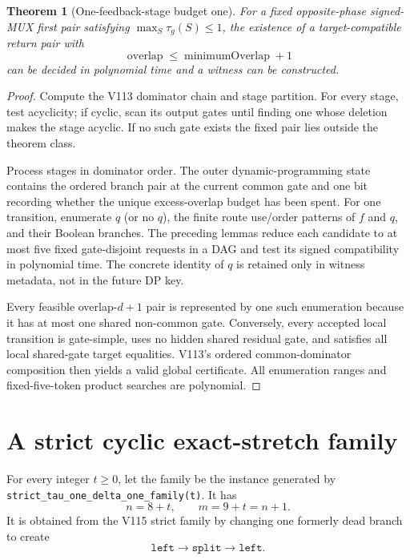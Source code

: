 \documentclass[11pt]{article}
\newtheorem{theorem}{Theorem}
\begin{document}
\begin{theorem}[One-feedback-stage budget one]
For a fixed opposite-phase signed-MUX first pair satisfying $\max_S\tau_g(S)\leq1$, the existence of a target-compatible return pair with
\[
\operatorname{overlap}\leq \operatorname{minimumOverlap}+1
\]
can be decided in polynomial time and a witness can be constructed.
\end{theorem}
\begin{proof}
Compute the V113 dominator chain and stage partition. For every stage, test acyclicity; if cyclic, scan its output gates until finding one whose deletion makes the stage acyclic. If no such gate exists the fixed pair lies outside the theorem class.

Process stages in dominator order. The outer dynamic-programming state contains the ordered branch pair at the current common gate and one bit recording whether the unique excess-overlap budget has been spent. For one transition, enumerate $q$ (or no $q$), the finite route use/order patterns of $f$ and $q$, and their Boolean branches. The preceding lemmas reduce each candidate to at most five fixed gate-disjoint requests in a DAG and test its signed compatibility in polynomial time. The concrete identity of $q$ is retained only in witness metadata, not in the future DP key.

Every feasible overlap-$d+1$ pair is represented by one such enumeration because it has at most one shared non-common gate. Conversely, every accepted local transition is gate-simple, uses no hidden shared residual gate, and satisfies all local shared-gate target equalities. V113's ordered common-dominator composition then yields a valid global certificate. All enumeration ranges and fixed-five-token product searches are polynomial.
\end{proof}

\section{A strict cyclic exact-stretch family}
For every integer $t\geq0$, let the family be the instance generated by \texttt{strict\_tau\_one\_delta\_one\_family(t)}. It has
\[
n=8+t,\qquad m=9+t=n+1.
\]
It is obtained from the V115 strict family by changing one formerly dead branch to create
\[
\texttt{left}\longrightarrow\texttt{split}\longrightarrow\texttt{left}.
\]
\end{document}
